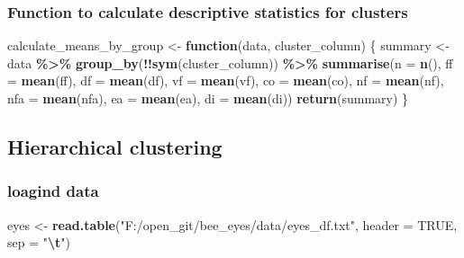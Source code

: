 \documentclass[
]{article}
\newenvironment{Shaded}{\begin{snugshade}}{\end{snugshade}}
\newcommand{\AttributeTok}[1]{\textcolor[rgb]{0.13,0.29,0.53}{#1}}
\newcommand{\ConstantTok}[1]{\textcolor[rgb]{0.56,0.35,0.01}{#1}}
\newcommand{\ControlFlowTok}[1]{\textcolor[rgb]{0.13,0.29,0.53}{\textbf{#1}}}
\newcommand{\FunctionTok}[1]{\textcolor[rgb]{0.13,0.29,0.53}{\textbf{#1}}}
\newcommand{\NormalTok}[1]{#1}
\newcommand{\OtherTok}[1]{\textcolor[rgb]{0.56,0.35,0.01}{#1}}
\newcommand{\SpecialCharTok}[1]{\textcolor[rgb]{0.81,0.36,0.00}{\textbf{#1}}}
\newcommand{\StringTok}[1]{\textcolor[rgb]{0.31,0.60,0.02}{#1}}
\begin{document}
\subsubsection{Function to calculate descriptive statistics for
clusters}\label{function-to-calculate-descriptive-statistics-for-clusters}

\begin{Shaded}
\begin{Highlighting}[]
\NormalTok{calculate\_means\_by\_group }\OtherTok{\textless{}{-}} \ControlFlowTok{function}\NormalTok{(data, cluster\_column) \{}
\NormalTok{  summary }\OtherTok{\textless{}{-}}\NormalTok{ data }\SpecialCharTok{\%\textgreater{}\%}
    \FunctionTok{group\_by}\NormalTok{(}\SpecialCharTok{!!}\FunctionTok{sym}\NormalTok{(cluster\_column)) }\SpecialCharTok{\%\textgreater{}\%}
    \FunctionTok{summarise}\NormalTok{(}\AttributeTok{n =} \FunctionTok{n}\NormalTok{(),}
              \AttributeTok{ff =} \FunctionTok{mean}\NormalTok{(ff),}
              \AttributeTok{df =} \FunctionTok{mean}\NormalTok{(df),}
              \AttributeTok{vf =} \FunctionTok{mean}\NormalTok{(vf),}
              \AttributeTok{co =} \FunctionTok{mean}\NormalTok{(co),}
              \AttributeTok{nf =} \FunctionTok{mean}\NormalTok{(nf),}
              \AttributeTok{nfa =} \FunctionTok{mean}\NormalTok{(nfa),}
              \AttributeTok{ea =} \FunctionTok{mean}\NormalTok{(ea),}
              \AttributeTok{di =} \FunctionTok{mean}\NormalTok{(di))}
  \FunctionTok{return}\NormalTok{(summary)}
\NormalTok{\}}
\end{Highlighting}
\end{Shaded}

\subsection{Hierarchical clustering}\label{hierarchical-clustering}

\subsubsection{loagind data}\label{loagind-data}

\begin{Shaded}
\begin{Highlighting}[]
\NormalTok{eyes }\OtherTok{\textless{}{-}} \FunctionTok{read.table}\NormalTok{(}\StringTok{"F:/open\_git/bee\_eyes/data/eyes\_df.txt"}\NormalTok{, }\AttributeTok{header =} \ConstantTok{TRUE}\NormalTok{, }\AttributeTok{sep =} \StringTok{"}\SpecialCharTok{\textbackslash{}t}\StringTok{"}\NormalTok{)}
\end{Highlighting}
\end{Shaded}
\end{document}
